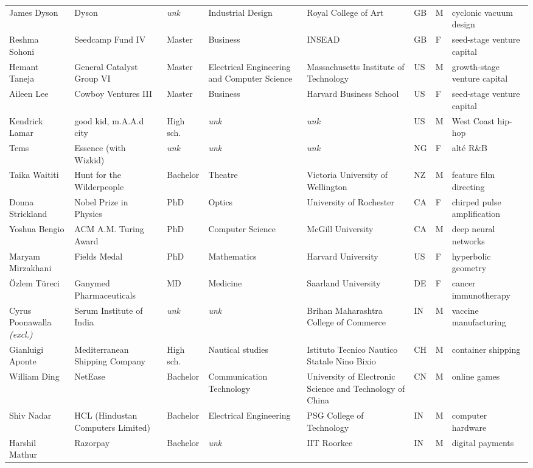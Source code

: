 \documentclass[11pt]{article}
\begin{document}
\begin{longtable}{@{}p{2.4cm}p{2.5cm}p{1.35cm}p{1.9cm}p{2.1cm}p{0.5cm}p{0.45cm}p{2.2cm}@{}}
James Dyson & Dyson & \textit{unk} & Industrial Design & Royal College of Art & GB & M & cyclonic vacuum design \\
Reshma Sohoni & Seedcamp Fund IV & Master & Business & INSEAD & GB & F & seed-stage venture capital \\
Hemant Taneja & General Catalyst Group VI & Master & Electrical Engineering and Computer Science & Massachusetts Institute of Technology & US & M & growth-stage venture capital \\
Aileen Lee & Cowboy Ventures III & Master & Business & Harvard Business School & US & F & seed-stage venture capital \\
Kendrick Lamar & good kid, m.A.A.d city & High sch. & \textit{unk} & \textit{unk} & US & M & West Coast hip-hop \\
Tems & Essence (with Wizkid) & \textit{unk} & \textit{unk} & \textit{unk} & NG & F & alté R\&B \\
Taika Waititi & Hunt for the Wilderpeople & Bachelor & Theatre & Victoria University of Wellington & NZ & M & feature film directing \\
Donna Strickland & Nobel Prize in Physics & PhD & Optics & University of Rochester & CA & F & chirped pulse amplification \\
Yoshua Bengio & ACM A.M. Turing Award & PhD & Computer Science & McGill University & CA & M & deep neural networks \\
Maryam Mirzakhani & Fields Medal & PhD & Mathematics & Harvard University & US & F & hyperbolic geometry \\
Özlem Türeci & Ganymed Pharmaceuticals & MD & Medicine & Saarland University & DE & F & cancer immunotherapy \\
Cyrus Poonawalla \textit{\scriptsize(excl.)} & Serum Institute of India & \textit{unk} & \textit{unk} & Brihan Maharashtra College of Commerce & IN & M & vaccine manufacturing \\
Gianluigi Aponte & Mediterranean Shipping Company & High sch. & Nautical studies & Istituto Tecnico Nautico Statale Nino Bixio & CH & M & container shipping \\
William Ding & NetEase & Bachelor & Communication Technology & University of Electronic Science and Technology of China & CN & M & online games \\
Shiv Nadar & HCL (Hindustan Computers Limited) & Bachelor & Electrical Engineering & PSG College of Technology & IN & M & computer hardware \\
Harshil Mathur & Razorpay & Bachelor & \textit{unk} & IIT Roorkee & IN & M & digital payments \\

\end{longtable}
\end{document}
